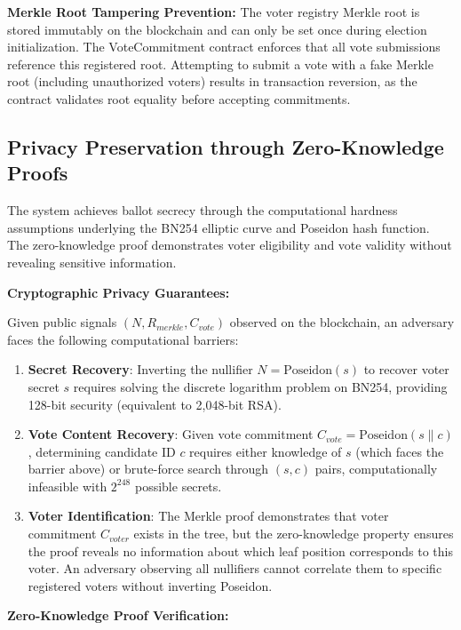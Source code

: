 \documentclass[conference]{IEEEtran}
\begin{document}
\textbf{Merkle Root Tampering Prevention:} The voter registry Merkle root is stored immutably on the blockchain and can only be set once during election initialization. The VoteCommitment contract enforces that all vote submissions reference this registered root. Attempting to submit a vote with a fake Merkle root (including unauthorized voters) results in transaction reversion, as the contract validates root equality before accepting commitments.

\subsection{Privacy Preservation through Zero-Knowledge Proofs}

The system achieves ballot secrecy through the computational hardness assumptions underlying the BN254 elliptic curve and Poseidon hash function. The zero-knowledge proof demonstrates voter eligibility and vote validity without revealing sensitive information.

\textbf{Cryptographic Privacy Guarantees:}

Given public signals $(N, R_{merkle}, C_{vote})$ observed on the blockchain, an adversary faces the following computational barriers:

\begin{enumerate}
    \item \textbf{Secret Recovery}: Inverting the nullifier $N = \text{Poseidon}(s)$ to recover voter secret $s$ requires solving the discrete logarithm problem on BN254, providing 128-bit security (equivalent to 2,048-bit RSA).
    
    \item \textbf{Vote Content Recovery}: Given vote commitment $C_{vote} = \text{Poseidon}(s \parallel c)$, determining candidate ID $c$ requires either knowledge of $s$ (which faces the barrier above) or brute-force search through $(s, c)$ pairs, computationally infeasible with $2^{248}$ possible secrets.
    
    \item \textbf{Voter Identification}: The Merkle proof demonstrates that voter commitment $C_{voter}$ exists in the tree, but the zero-knowledge property ensures the proof reveals no information about which leaf position corresponds to this voter. An adversary observing all nullifiers cannot correlate them to specific registered voters without inverting Poseidon.
\end{enumerate}

\textbf{Zero-Knowledge Proof Verification:}
\end{document}
